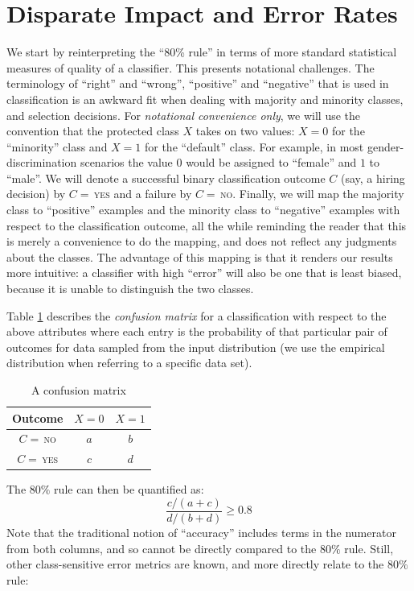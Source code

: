 \section{Disparate Impact and Error Rates}
\label{sec:note-meas-disp}

We start by reinterpreting the  ``80\% rule'' in terms of more standard statistical measures of quality of a classifier. This presents notational challenges. The terminology of ``right'' and ``wrong'', ``positive'' and ``negative'' that is used in classification is an awkward fit when dealing with majority and minority classes, and selection decisions. For \emph{notational convenience only}, we will use the convention that the protected class $X$ takes on two values: $X =0$ for the ``minority'' class and $X = 1$ for the ``default'' class. For example, in most gender-discrimination scenarios the value $0$ would be assigned to ``female'' and $1$ to ``male''. We will denote a successful binary classification outcome $C$ (say, a hiring decision) by $C =\,$\textsc{yes} and a failure by $C=\, $\textsc{no}. Finally, we will map the majority class to ``positive'' examples and the minority class to ``negative'' examples with respect to the classification outcome, all the while reminding the reader that this is merely a convenience to do the mapping, and does not reflect any judgments about the classes. The advantage of this mapping is that it renders our results more intuitive: a classifier with high ``error'' will also be one that is least biased, because it is unable to distinguish the two classes. 



Table \ref{tab:confusion} describes the \emph{confusion matrix} for a classification with respect to the above attributes where each entry is the probability of that particular pair of outcomes for data sampled from the input distribution (we use the empirical distribution when referring to a specific data set).
\begin{table}[htbp]
  \centering
  \begin{tabular}{c|c|c|}
  Outcome & $X = 0$ & $X = 1$ \\ \hline
  $C=\,$\textsc{no} & $a$ & $b$\\ \hline
$C=\,$\textsc{yes} & $c$& $d$\\ \hline
\end{tabular}
\caption{A confusion matrix\label{tab:confusion}}
\end{table}

The $80\%$ rule can then be quantified as: 
\[ \frac{c/(a + c)}{d/(b + d)} \ge 0.8 \]
Note that the traditional notion of ``accuracy'' includes terms in the numerator from both columns, and so cannot be directly compared to the $80\%$ rule. Still, other class-sensitive error metrics are known, and more directly relate to the $80\%$ rule:

